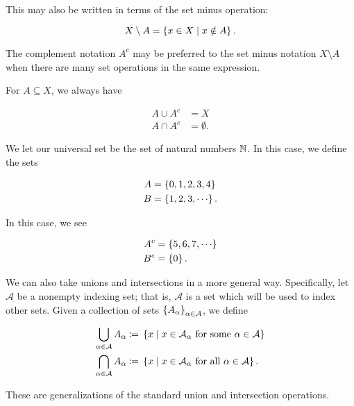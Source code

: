 \noindent
This may also be written in terms of the set minus operation:

\begin{equation}
    X\setminus A = \left\{ x\in X \mid x\notin A \right\}.
\end{equation}

\noindent
The complement notation $A^{c}$ may be preferred to the set minus notation
$X\setminus A$ when there are many set operations in the same expression.

For $A\subseteq X$, we always have

\begin{align}
    A \cup A^{c} &= X \nonumber\\
    A \cap A^{c} &= \emptyset.
\end{align}

\begin{example}
We let our universal set be the set of natural numbers $\mathbb{N}$.
In this case, we define the sets

\begin{align}
    A &= \braces{0,1,2,3,4} \nonumber\\
    B &= \braces{1,2,3,\cdots}.
\end{align}

\noindent
In this case, we see

\begin{align}
    A^{c} &= \braces{5,6,7,\cdots} \nonumber\\
    B^{c} &= \braces{0}.
\end{align}
\end{example}

We can also take unions and intersections in a more general way.
Specifically, let $\mathcal{A}$ be a nonempty indexing set;
that is, $\mathcal{A}$ is a set which will be used to index other sets.
Given a collection of sets $\left\{ A_{\alpha} \right\}_{\alpha\in\mathcal{A}}$,
we define

\begin{align}
    \bigcup_{\alpha\in\mathcal{A}} A_{\alpha} &\coloneqq{} 
        \left\{ x\mid x\in \mathcal{A}_{\alpha} \text{ for some }
        \alpha\in\mathcal{A} \right\} \nonumber\\
    \bigcap_{\alpha\in\mathcal{A}} A_{\alpha} &\coloneqq{} 
        \left\{ x\mid x\in \mathcal{A}_{\alpha} \text{ for all }
        \alpha\in\mathcal{A} \right\}.
\end{align}

\noindent
These are generalizations of the standard union and intersection operations.

